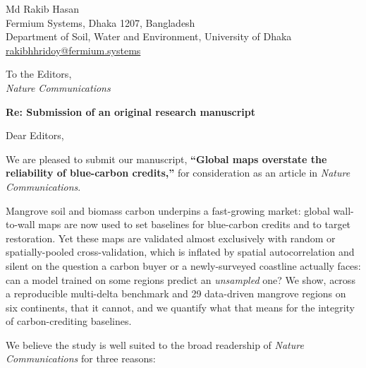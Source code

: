 \documentclass[11pt]{letter}
\begin{document}
\begin{flushright}
Md Rakib Hasan\\
Fermium Systems, Dhaka 1207, Bangladesh\\
Department of Soil, Water and Environment, University of Dhaka\\
\href{mailto:rakibhhridoy@fermium.systems}{rakibhhridoy@fermium.systems}
\end{flushright}

To the Editors,\\
\textit{Nature Communications}

\textbf{Re: Submission of an original research manuscript}

Dear Editors,

We are pleased to submit our manuscript, \textbf{``Global maps overstate the reliability
of blue-carbon credits,''} for consideration as an article in \textit{Nature
Communications}.

Mangrove soil and biomass carbon underpins a fast-growing market: global wall-to-wall
maps are now used to set baselines for blue-carbon credits and to target restoration. Yet
these maps are validated almost exclusively with random or spatially-pooled
cross-validation, which is inflated by spatial autocorrelation and silent on the question
a carbon buyer or a newly-surveyed coastline actually faces: can a model trained on some
regions predict an \emph{unsampled} one? We show, across a reproducible multi-delta
benchmark and 29 data-driven mangrove regions on six continents, that it cannot, and we
quantify what that means for the integrity of carbon-crediting baselines.

We believe the study is well suited to the broad readership of \textit{Nature
Communications} for three reasons:
\end{document}

